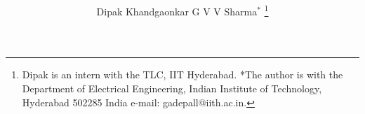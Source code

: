 \documentclass[journal,12pt,twocolumn]{IEEEtran}
\begin{document}

\def\putbox#1#2#3{\makebox[0in][l]{\makebox[#1][l]{}\raisebox{\baselineskip}[0in][0in]{\raisebox{#2}[0in][0in]{#3}}}}
     \def\rightbox#1{\makebox[0in][r]{#1}}
     \def\centbox#1{\makebox[0in]{#1}}
     \def\topbox#1{\raisebox{-\baselineskip}[0in][0in]{#1}}
     \def\midbox#1{\raisebox{-0.5\baselineskip}[0in][0in]{#1}}

\vspace{3cm}

\title{ 
}


%
%
%

\author{Dipak Khandgaonkar G V V Sharma$^{*}$ %
\thanks{Dipak is an intern with the TLC, IIT Hyderabad.  *The author is with the Department
of Electrical Engineering, Indian Institute of Technology, Hyderabad
502285 India e-mail:  gadepall@iith.ac.in.}%
}
% 
%
\end{document}
